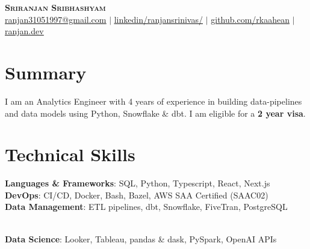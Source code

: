 \documentclass[letterpaper,11pt]{article}
\begin{document}

\begin{center}
    \textbf{\Huge \scshape Sriranjan Sribhashyam} \\ \vspace{2pt}
    \href{mailto:ranjan31051997@gmail.com}{\underline{ranjan31051997@gmail.com}} $|$ 
    \href{https://www.linkedin.com/in/ranjansrinivas/}{\underline{linkedin/ranjansrinivas/}} $|$
    \href{https://github.com/rkaahean}{\underline{github.com/rkaahean}} $|$
    \href{https://ranjan.dev}{\underline{ranjan.dev}}

\end{center}

\section{Summary}
\small{
  I am an Analytics Engineer with 4 years of experience in building data-pipelines and data models using Python, Snowflake & dbt.
  I am eligible for a \textbf{2 year visa}.
}

\section{Technical Skills}
 \begin{itemize}[leftmargin=0.15in, label={}]
    \small{\item{
     \textbf{Languages \& Frameworks}{: SQL, Python, Typescript, React, Next.js} \\
     \textbf{DevOps}{: CI/CD, Docker, Bash, Bazel, AWS SAA Certified (SAA\-C02)} \\
     \textbf{Data Management}{: ETL pipelines, dbt, Snowflake, FiveTran, PostgreSQL}
    }} \\
    \textbf{Data Science}{: Looker, Tableau, pandas \& dask, PySpark, OpenAI APIs}
 \end{itemize}



\end{document}
